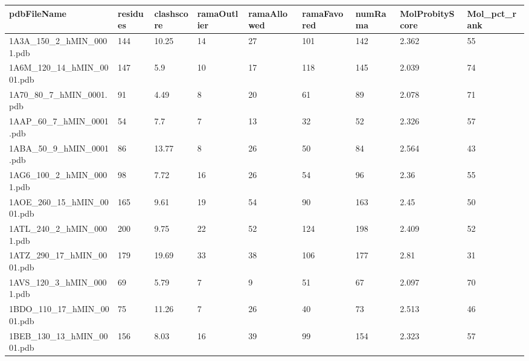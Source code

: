 \documentclass{bioinfo}
\begin{document}
\begin{table}[!t]
{\begin{tabular}{lllllllll}\toprule
    pdbFileName             & residues & clashscore & ramaOutlier & ramaAllowed & ramaFavored & numRama & MolProbityScore & Mol\_pct\_rank \\ \midrule
    1A3A\_150\_2\_hMIN\_0001.pdb & 144      & 10.25      & 14          & 27          & 101         & 142     & 2.362           & 55           \\
    1A6M\_120\_14\_hMIN\_0001.pdb & 147      & 5.9        & 10          & 17          & 118         & 145     & 2.039           & 74           \\
    1A70\_80\_7\_hMIN\_0001.pdb & 91       & 4.49       & 8           & 20          & 61          & 89      & 2.078           & 71           \\
    1AAP\_60\_7\_hMIN\_0001.pdb & 54       & 7.7        & 7           & 13          & 32          & 52      & 2.326           & 57           \\
    1ABA\_50\_9\_hMIN\_0001.pdb & 86       & 13.77      & 8           & 26          & 50          & 84      & 2.564           & 43           \\
    1AG6\_100\_2\_hMIN\_0001.pdb & 98       & 7.72       & 16          & 26          & 54          & 96      & 2.36            & 55           \\
    1AOE\_260\_15\_hMIN\_0001.pdb & 165      & 9.61       & 19          & 54          & 90          & 163     & 2.45            & 50           \\
    1ATL\_240\_2\_hMIN\_0001.pdb & 200      & 9.75       & 22          & 52          & 124         & 198     & 2.409           & 52           \\
    1ATZ\_290\_17\_hMIN\_0001.pdb & 179      & 19.69      & 33          & 38          & 106         & 177     & 2.81            & 31           \\
    1AVS\_120\_3\_hMIN\_0001.pdb & 69       & 5.79       & 7           & 9           & 51          & 67      & 2.097           & 70           \\
    1BDO\_110\_17\_hMIN\_0001.pdb & 75       & 11.26      & 7           & 26          & 40          & 73      & 2.513           & 46           \\
    1BEB\_130\_13\_hMIN\_0001.pdb & 156      & 8.03       & 16          & 39          & 99          & 154     & 2.323           & 57           \\

\end{tabular}}
\end{table}
\end{document}

